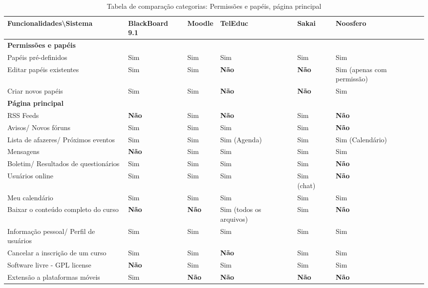 \begin{landscape}
\begin{table}[H]
\begin{tabular}{|@{}p{5.5cm}|p{3.5cm}|p{3.5cm}|p{3.5cm}|p{3.5cm}|p{3.5cm}@{}|}
\hline
\textbf{Funcionalidades\textbackslash Sistema} & \textbf{BlackBoard 9.1} & \textbf{Moodle} & \textbf{TelEduc} & \textbf{Sakai} & \textbf{Noosfero}\\ \hline
\textbf{Permissões e papéis} &  &  &  &  &  \\
Papéis pré-definidos & Sim & Sim & Sim & Sim & Sim \\
Editar papéis existentes & Sim & Sim & \textbf{Não}  & \textbf{Não}  & Sim {\tiny(apenas com permissão)} \\
Criar novos papéis & Sim & Sim & \textbf{Não}  & \textbf{Não}  & Sim \\ \hline
\textbf{Página principal} &  &  &  &  &  \\
RSS Feeds & \textbf{Não}  & Sim & \textbf{Não}  & Sim & \textbf{Não}  \\
Avisos/ Novos fóruns & Sim & Sim & Sim & Sim & \textbf{Não}  \\
Lista de afazeres/ Próximos eventos & Sim & Sim & Sim {\tiny(Agenda)} & Sim & Sim {\tiny(Calendário)} \\
Mensagens & \textbf{Não}  & Sim & Sim & Sim & Sim \\
Boletim/ Resultados de questionários & Sim & Sim & Sim & Sim & \textbf{Não}  \\
Usuários online & Sim & Sim & Sim & Sim {\tiny(chat)} & \textbf{Não}  \\
Meu calendário & Sim & Sim & Sim & Sim & Sim \\
Baixar o conteúdo completo do curso & \textbf{Não}  & \textbf{Não}  & Sim {\tiny(todos os arquivos)} & Sim & \textbf{Não}  \\
Informação pessoal/ Perfil de usuários & Sim & Sim & Sim & Sim & Sim \\
Cancelar a inscrição de um curso & Sim & Sim & \textbf{Não}  & Sim & Sim \\
Software livre - GPL license & \textbf{Não}  & Sim & Sim & Sim & Sim \\
Extensão a plataformas móveis & Sim & \textbf{Não}  & \textbf{Não}  & \textbf{Não}  & \textbf{Não}  \\ \hline
\end{tabular}
\caption{Tabela de comparação categorias: Permissões e papéis, página principal}
\label{tab:permissoes-principal}
\end{table}

\end{landscape}

